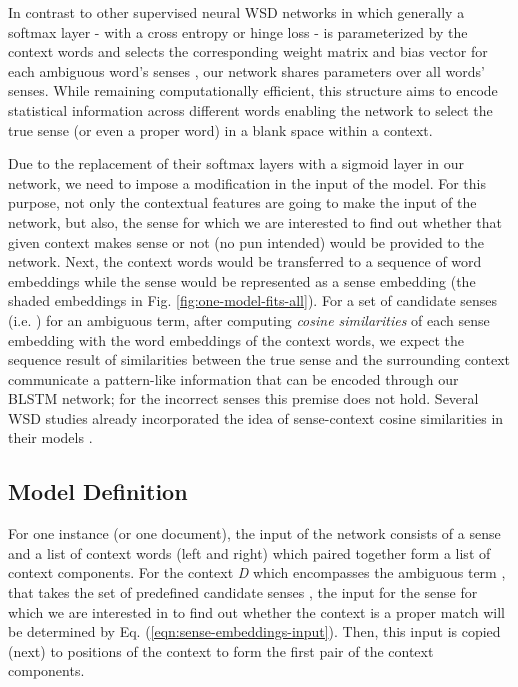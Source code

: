 \documentclass{llncs}
\begin{document}
In contrast to other supervised neural WSD networks in which generally a softmax layer - with a cross entropy or hinge loss - is parameterized by the context words and selects the corresponding weight matrix and bias vector for each ambiguous word's senses \cite{kaageback2016word}\cite{taghipour2015semi}, our network shares parameters over all words' senses. While remaining computationally efficient, this structure aims to encode statistical information across different words enabling the network to select the true sense (or even a proper word) in a blank space within a context. 


Due to the replacement of their softmax layers with a sigmoid layer in our network, we need to impose a modification in the input of the model. For this purpose, not only the contextual features are going to make the input of the network, but also, the sense for which we are interested to find out whether that given context makes sense or not (no pun intended) would be provided to the network. Next, the context words would be transferred to a sequence of word embeddings while the sense would be represented as a sense embedding (the shaded embeddings in Fig. \ref{fig:one-model-fits-all}). For a set of candidate senses (i.e. ) for an ambiguous term, after computing \textit{cosine similarities} of each sense embedding with the word embeddings of the context words, we expect the sequence result of similarities between the true sense and the surrounding context communicate a pattern-like information that can be encoded through our BLSTM network; for the incorrect senses this premise does not hold. Several WSD studies already incorporated the idea of sense-context cosine similarities in their models \cite{mcinnes2013evaluating}\cite{pedersen2009wordnet}.

\subsection{Model Definition}
For one instance (or one document), the input of the network consists of a sense and a list of context words (left and right) which paired together form a list of context components. For the context \textit{D} which encompasses the ambiguous term , that takes the set of predefined candidate senses , the input for the sense  for which we are interested in to find out whether the context is a proper match will be determined by Eq. (\ref{eqn:sense-embeddings-input}). Then, this input is copied (next) to  positions of the context to form the first pair of the context components.
\end{document}
